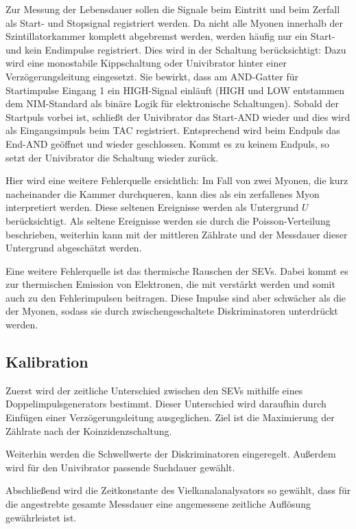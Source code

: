 Zur Messung der Lebensdauer sollen die Signale beim Eintritt und beim Zerfall als Start- und Stopsignal registriert werden. Da nicht alle Myonen innerhalb der Szintillatorkammer komplett abgebremst werden, werden h\"aufig nur ein Start- und kein Endimpulse registriert. Dies wird in der Schaltung ber\"ucksichtigt: Dazu wird eine monostabile Kippschaltung oder Univibrator hinter einer Verz\"ogerungsleitung eingesetzt. Sie bewirkt, dass am AND-Gatter f\"ur Startimpulse Eingang 1 ein HIGH-Signal einl\"auft (HIGH und LOW entstammen dem NIM-Standard als bin\"are Logik f\"ur elektronische Schaltungen). Sobald der Startpuls vorbei ist, schlie{\ss}t der Univibrator das Start-AND wieder und dies wird als Eingangsimpuls beim TAC registriert. Entsprechend wird beim Endpuls das End-AND ge\"offnet und wieder geschlossen. Kommt es zu keinem Endpuls, so setzt der Univibrator die Schaltung wieder zurück.

Hier wird eine weitere Fehlerquelle ersichtlich: Im Fall von zwei Myonen, die kurz nacheinander die Kammer durchqueren, kann dies als ein zerfallenes Myon interpretiert werden. Diese seltenen Ereignisse werden als Untergrund $U$ ber\"ucksichtigt. Als seltene Ereignisse werden sie durch die Poisson-Verteilung beschrieben, weiterhin kann mit der mittleren Z\"ahlrate und der Messdauer dieser Untergrund abgesch\"atzt werden.

Eine weitere Fehlerquelle ist das thermische Rauschen der SEVs. Dabei kommt es zur thermischen Emission von Elektronen, die mit verst\"arkt werden und somit auch zu den Fehlerimpulsen beitragen. Diese Impulse sind aber schw\"acher als die der Myonen, sodass sie durch zwischengeschaltete Diskriminatoren unterdr\"uckt werden.

\subsection{Kalibration}
Zuerst wird der zeitliche Unterschied zwischen den SEVs mithilfe eines Doppelimpulsgenerators bestimmt. Dieser Unterschied wird daraufhin durch Einf\"ugen einer Verz\"ogerungsleitung ausgeglichen. Ziel ist die Maximierung der Z\"ahlrate nach der Koinzidenzschaltung.

Weiterhin werden die Schwellwerte der Diskriminatoren eingeregelt. Au{\ss}erdem wird f\"ur den Univibrator passende Suchdauer gew\"ahlt.

Abschlie{\ss}end wird die Zeitkonstante des Vielkanalanalysators so gew\"ahlt, dass f\"ur die angestrebte gesamte Messdauer eine angemessene zeitliche Aufl\"osung gew\"ahrleistet ist.



